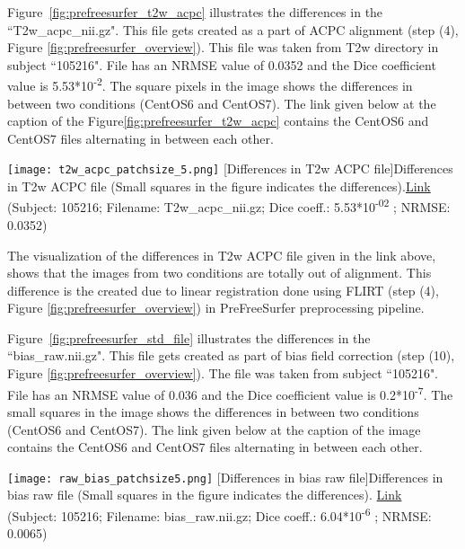 Figure~\ref{fig:prefreesurfer_t2w_acpc} illustrates the differences in the ``T2w\_acpc\_nii.gz". This file gets created as a part of ACPC alignment (step (4), Figure \ref{fig:prefreesurfer_overview}). This file was taken from T2w directory in subject ``105216". File has an NRMSE value of 0.0352 and the Dice coefficient value is 5.53*10\textsuperscript{-2}. The square pixels in the image shows the differences in between two conditions (CentOS6 and CentOS7). The link given below at the caption of the Figure\ref{fig:prefreesurfer_t2w_acpc} contains the CentOS6 and CentOS7 files alternating in between each other.

\begin{center}
\texttt{[image: t2w\_acpc\_patchsize\_5.png]}
  [Differences in T2w ACPC file]{Differences in T2w ACPC file (Small squares in the figure indicates the differences).\href{https://drive.google.com/file/d/1NrNl7POyCS_SZm3an00wOLUnkmLJ_ngo/view?usp=sharing}{Link}\\(Subject: 105216; Filename: T2w\_acpc\_nii.gz; Dice coeff.: 5.53*10\textsuperscript{-02} ; NRMSE: 0.0352)}
\label{fig:prefreesurfer_t2w_acpc}
\end{center}

The visualization of the differences in T2w ACPC file given in the link above, shows that the images from two conditions are totally out of alignment. This difference is the created due to linear registration done using FLIRT (step (4), Figure \ref{fig:prefreesurfer_overview}) in PreFreeSurfer preprocessing pipeline.

Figure~\ref{fig:prefreesurfer_std_file} illustrates the differences in the ``bias\_raw.nii.gz".
This file gets created as part of bias field correction (step (10), Figure \ref{fig:prefreesurfer_overview}). The file was taken from subject ``105216". File has an NRMSE value of 0.036 and the Dice coefficient value is 0.2*10\textsuperscript{-7}. The small squares in the image shows the differences in between two conditions (CentOS6 and CentOS7).
The link given below at the caption of the image contains the CentOS6 and CentOS7 files alternating in between each other.

\begin{center}
\texttt{[image: raw\_bias\_patchsize5.png]}
[Differences in bias raw file]{Differences in bias raw file (Small squares in the figure indicates the differences). \href{https://drive.google.com/file/d/1rbGR0zGPQsOPzEVkiR6NynudbfjDFLvn/view?usp=sharing}{Link}\\(Subject: 105216; Filename: bias\_raw.nii.gz; Dice coeff.: 6.04*10\textsuperscript{-6} ; NRMSE: 0.0065)}
\label{fig:prefreesurfer_std_file}
\end{center}

